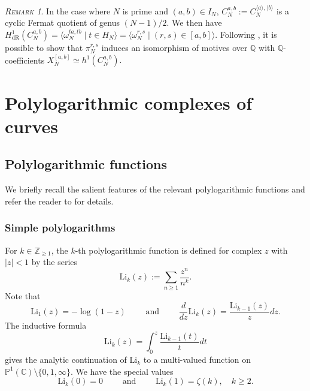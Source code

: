 \documentclass[11pt,a4,leqno]{amsart}
\theoremstyle{my theoremstyle}
\theoremstyle{dfn}
\theoremstyle{remark}
\newtheorem{rmk}[thm]{{\scshape Remark}}
\renewcommand{\1}{\mathbbm{1}}
\newcommand{\Z}{\mathbb{Z}}
\newcommand{\Q}{\mathbb{Q}}
\newcommand{\C}{\mathbb{C}}
\numberwithin{equation}{section}
\begin{document}
\begin{rmk}\label{rmk:Cmot}
    In the case where $N$ is prime and $(a,b)\in I_N$, $C_N^{a,b}:=C_N^{\langle a\rangle,\langle b\rangle}$ is a cyclic Fermat quotient of genus $(N-1)/2$. We then have
$
H^1_{\mathrm{dR}}(C_N^{a,b})=\langle \omega_N^{ta,tb} \mid t\in H_N \rangle=\langle \omega_N^{r,s} \mid (r,s)\in [a,b] \rangle.
$
Following \cite[Remark 2.13]{Ots11}, it is possible to show that $\pi^{r,s}_N$ induces an isomorphism of motives over $\Q$ with $\Q$-coefficients
$
X_N^{[a,b]}\simeq h^1(C_N^{a,b}).
$
\end{rmk}





 
\section{Polylogarithmic complexes of curves} \label{sec:cocycles}

\subsection{Polylogarithmic functions}

We briefly recall the salient features of the relevant polylogarithmic functions and refer the reader to \cite{Goncharov} for details. 

\subsubsection{Simple polylogarithms}
For $k\in \Z_{\geq 1}$, the $k$-th polylogarithmic function is defined for complex $z$ with $\vert z\vert < 1$ by the series
\begin{equation}\label{def:Lik}
    \mathrm{Li}_k(z):=\sum_{n\geq 1} \frac{z^n}{n^k}.
\end{equation}
Note that 
\begin{equation}\label{polylog:deriv}
    \mathrm{Li}_1(z)=-\log(1-z) \qquad \text{ and } \qquad \frac{d}{dz} \mathrm{Li}_k(z)=\frac{\mathrm{Li}_{k-1}(z)}{z}dz.
\end{equation}
The inductive formula 
\[
\mathrm{Li}_k(z)=\int_0^z \frac{\mathrm{Li}_{k-1}(t)}{t}dt
\]
gives the analytic continuation of $\mathrm{Li}_k$ to a multi-valued function on $\mathbb{P}^1(\C)\setminus \{ 0,1,\infty \}$. We have the special values 
\[
\mathrm{Li}_k(0)=0 \qquad \text{ and } \qquad \mathrm{Li}_k(1)=\zeta(k), \quad k\geq 2.
\]
\end{document}
